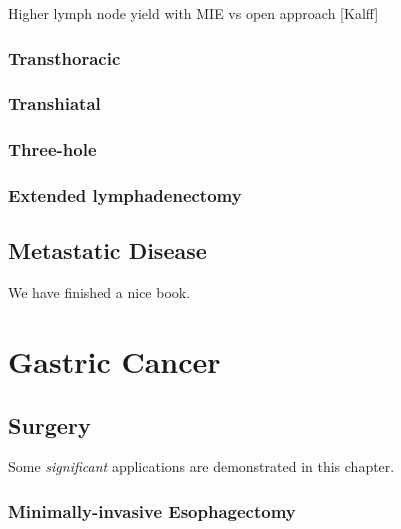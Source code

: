 \documentclass[
]{book}
\begin{document}
Higher lymph node yield with MIE vs open approach {[}Kalff{]}

\hypertarget{transthoracic-1}{%
\section{Transthoracic}\label{transthoracic-1}}

\hypertarget{transhiatal-1}{%
\section{Transhiatal}\label{transhiatal-1}}

\hypertarget{three-hole-1}{%
\section{Three-hole}\label{three-hole-1}}

\hypertarget{extended-lymphadenectomy-1}{%
\section{Extended lymphadenectomy}\label{extended-lymphadenectomy-1}}

\hypertarget{metastatic-disease}{%
\chapter{Metastatic Disease}\label{metastatic-disease}}

We have finished a nice book.

\hypertarget{part-gastric-cancer}{%
\part*{Gastric Cancer}\label{part-gastric-cancer}}

\hypertarget{surgery-2}{%
\chapter{Surgery}\label{surgery-2}}

Some \emph{significant} applications are demonstrated in this chapter.

\hypertarget{minimally-invasive-esophagectomy-3}{%
\section{Minimally-invasive Esophagectomy}\label{minimally-invasive-esophagectomy-3}}
\end{document}
